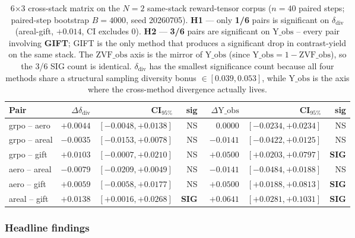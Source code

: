 \documentclass{article}
\begin{document}
\begin{table}[h]
\centering
\footnotesize
\begin{tabular}{l r r r r r r}
\toprule
\textbf{Pair} & $\Delta\delta_{\mathrm{div}}$ & CI$_{95\%}$ & sig
            & $\Delta\mathrm{Y\_obs}$ & CI$_{95\%}$ & sig \\
\midrule
grpo -- aero  & $+0.0044$ & $[-0.0048,+0.0138]$ & NS  & $\phantom{-}0.0000$ & $[-0.0234,+0.0234]$ & NS  \\
grpo -- areal & $-0.0035$ & $[-0.0153,+0.0078]$ & NS  & $-0.0141$            & $[-0.0422,+0.0125]$ & NS  \\
grpo -- gift  & $+0.0103$ & $[-0.0007,+0.0210]$ & NS  & $+0.0500$            & $[+0.0203,+0.0797]$ & \textbf{SIG} \\
aero -- areal & $-0.0079$ & $[-0.0209,+0.0049]$ & NS  & $-0.0141$            & $[-0.0484,+0.0188]$ & NS  \\
aero -- gift  & $+0.0059$ & $[-0.0058,+0.0177]$ & NS  & $+0.0500$            & $[+0.0188,+0.0813]$ & \textbf{SIG} \\
areal -- gift & $+0.0138$ & $[+0.0016,+0.0268]$ & \textbf{SIG} & $+0.0641$ & $[+0.0281,+0.1031]$ & \textbf{SIG} \\
\bottomrule
\end{tabular}
\caption{6$\times$3 cross-stack matrix on the $N\!=\!2$ same-stack
reward-tensor corpus ($n\!=\!40$ paired steps; paired-step bootstrap
$B\!=\!4000$, seed 20260705).
\textbf{H1} --- only \textbf{1/6} pairs is significant on
$\delta_{\mathrm{div}}$ (areal-gift, $+0.014$, CI excludes 0).
\textbf{H2} --- \textbf{3/6} pairs are significant on
$\mathrm{Y\_obs}$ -- every pair involving \textbf{GIFT};
GIFT is the only method that produces a significant drop in
contrast-yield on the same stack. The $\mathrm{ZVF\_obs}$ axis is
the mirror of $\mathrm{Y\_obs}$ (since $\mathrm{Y\_obs}=1-\mathrm{ZVF\_obs}$),
so the 3/6 SIG count is identical.
$\delta_{\mathrm{div}}$ has the smallest significance count
because all four methods share a structural sampling diversity
bonus $\in [0.039,0.053]$, while $\mathrm{Y\_obs}$ is the axis
where the cross-method divergence actually lives.}
\label{tab:p6-iter86-matrix}
\end{table}

\subsubsection{Headline findings}
\end{document}
